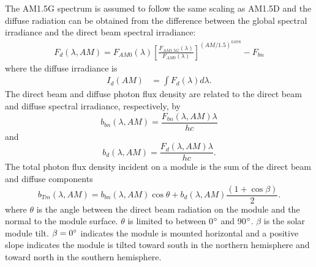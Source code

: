 \documentclass[preprint,12pt]{elsarticle}
\newcommand{\blue}[1]{{\leavevmode\color{blue}{#1}}} %
\begin{document}
The AM1.5G spectrum is assumed to follow the same scaling as AM1.5D and the diffuse radiation can be obtained from the difference between the global spectral irradiance and the direct beam spectral irradiance:
\begin{align}
F_{d} (\lambda, AM) = F_{AM0} (\lambda) 
 \left [ \frac{F_{AM1.5G} (\lambda)}{F_{AM0} (\lambda)}  \right ] ^ {\left ( AM/1.5 \right ) ^{0.678}} - 
F_{bn} 
\end{align}
where the diffuse irradiance is 
\begin{align}
I_{d} (AM) & = \int F_{d} (\lambda) d \lambda
\label{eq:IAMDb}.
\end{align}
The direct beam and diffuse photon flux density are related to the direct beam and diffuse spectral irradiance, respectively, by
\begin{equation}
b_{bn} (\lambda, AM) = \frac{F_{bn} (\lambda, AM) \lambda} {h c}
\end{equation}
and
\begin{equation}
b_{d} (\lambda, AM) = \frac{F_{d} (\lambda, AM) \lambda} {h c}.
\end{equation}
The total photon flux density incident on a module is the sum of the direct beam and diffuse components
\begin{equation}
b_{Tm} (\lambda, AM) = b_{bn}  (\lambda, AM) \cos \theta + b_d  (\lambda, AM) \frac{(1 + \cos \beta)}{2}.
\end{equation}
where $\theta$ is the angle between the direct beam radiation on the module and the normal to
the module surface. $\theta$ is limited to between 0$\degree$ and 90$\degree$.  
$\beta$ is the solar module tilt.  $\beta = 0\degree$ indicates the module is mounted horizontal
and a positive slope indicates the module is tilted toward south in the northern hemisphere and toward north in the southern hemisphere.  
\end{document}
